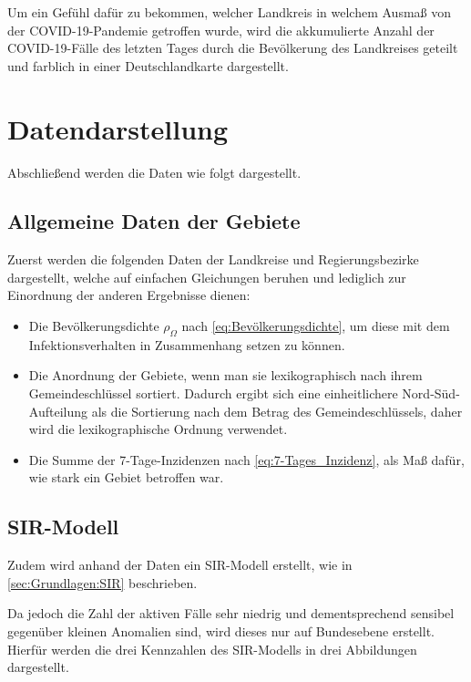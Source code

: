 Um ein Gefühl dafür zu bekommen, welcher Landkreis in welchem Ausmaß von der COVID-19-Pandemie getroffen wurde, wird die akkumulierte Anzahl der COVID-19-Fälle des letzten Tages durch die Bevölkerung des Landkreises geteilt und farblich in einer Deutschlandkarte dargestellt.
%
\section{Datendarstellung}
Abschließend werden die Daten wie folgt dargestellt.
\subsection{Allgemeine Daten der Gebiete}
Zuerst werden die folgenden Daten der Landkreise und Regierungsbezirke dargestellt, welche auf einfachen Gleichungen beruhen und lediglich zur Einordnung der anderen Ergebnisse dienen:
\begin{itemize}
    \item Die Bevölkerungsdichte $\rho_\Omega$ nach \autoref{eq:Bevölkerungsdichte}, um diese mit dem Infektionsverhalten in Zusammenhang setzen zu können.
    \item Die Anordnung der Gebiete, wenn man sie lexikographisch nach ihrem Gemeindeschlüssel sortiert. Dadurch ergibt sich eine einheitlichere Nord-Süd-Aufteilung als die Sortierung nach dem Betrag des Gemeindeschlüssels, daher wird die lexikographische Ordnung verwendet.
    \item Die Summe der 7-Tage-Inzidenzen nach \autoref{eq:7-Tages_Inzidenz}, als Maß dafür, wie stark ein Gebiet betroffen war.
\end{itemize}
\subsection{SIR-Modell}
Zudem wird anhand der Daten ein SIR-Modell erstellt, wie in \autoref{sec:Grundlagen:SIR} beschrieben.

Da jedoch die Zahl der aktiven Fälle sehr niedrig und dementsprechend sensibel gegenüber kleinen Anomalien sind, wird dieses nur auf Bundesebene erstellt. 
Hierfür werden die drei Kennzahlen des SIR-Modells in drei Abbildungen dargestellt.
